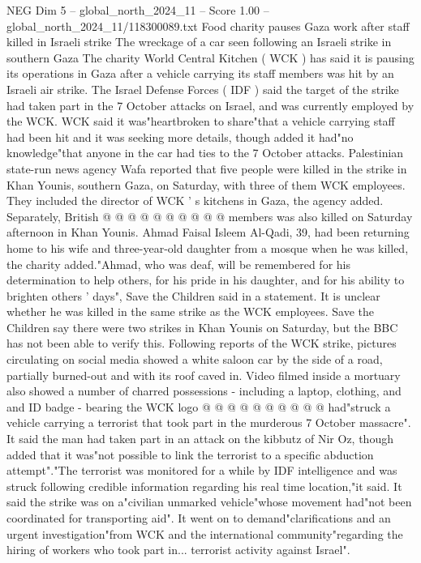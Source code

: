 \begin{textsample}{NEG Dim 5 – global\_north\_2024\_11 – Score 1.00 – global\_north\_2024\_11/118300089.txt}  \label{ex:f5_neg_418}
Food charity pauses Gaza work after staff killed in Israeli strike The wreckage of a car seen following an Israeli strike in southern Gaza The charity World Central Kitchen ( WCK ) has said it is pausing its operations in Gaza after a vehicle carrying its staff members was hit by an Israeli air strike.
The Israel Defense Forces ( IDF ) said the target of the strike had taken part in the 7 October attacks on Israel, and was currently employed by the WCK.
WCK said it was"heartbroken to share"that a vehicle carrying staff had been hit and it was seeking more details, though added it had"no knowledge"that anyone in the car had ties to the 7 October attacks.
Palestinian state-run news agency Wafa reported that five people were killed in the strike in Khan Younis, southern Gaza, on Saturday, with three of them WCK employees.
They included the director of WCK ' s kitchens in Gaza, the agency added.
Separately, British @ @ @ @ @ @ @ @ @ @ members was also killed on Saturday afternoon in Khan Younis.
Ahmad Faisal Isleem Al-Qadi, 39, had been returning home to his wife and three-year-old daughter from a mosque when he was killed, the charity added."Ahmad, who was deaf, will be remembered for his determination to help others, for his pride in his daughter, and for his ability to brighten others ' days", Save the Children said in a statement.
It is unclear whether he was killed in the same strike as the WCK employees.
Save the Children say there were two strikes in Khan Younis on Saturday, but the BBC has not been able to verify this.
Following reports of the WCK strike, pictures circulating on social media showed a white saloon car by the side of a road, partially burned-out and with its roof caved in.
Video filmed inside a mortuary also showed a number of charred possessions - including a laptop, clothing, and and ID badge - bearing the WCK logo @ @ @ @ @ @ @ @ @ @ had"struck a vehicle carrying a terrorist that took part in the murderous 7 October massacre".
It said the man had taken part in an attack on the kibbutz of Nir Oz, though added that it was"not possible to link the terrorist to a specific abduction attempt"."The terrorist was monitored for a while by IDF intelligence and was struck following credible information regarding his real time location,"it said.
It said the strike was on a"civilian unmarked vehicle"whose movement had"not been coordinated for transporting aid".
It went on to demand"clarifications and an urgent investigation"from WCK and the international community"regarding the hiring of workers who took part in... terrorist activity against Israel".

\end{textsample}
